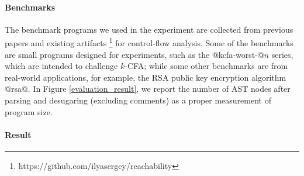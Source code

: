 \paragraph{Benchmarks}
The benchmark programs we used in the experiment are collected from
previous papers \cite{Johnson:2013:OAA:2500365.2500604, ashley:practical,
DBLP:journals/corr/abs-1102-3676} and existing artifacts
\footnote{https://github.com/ilyasergey/reachability} for control-flow
analysis.  Some of the benchmarks are small programs designed for
experiments, such as the @kcfa-worst-@$n$ series, which are intended
to challenge $k$-CFA; while some other benchmarks are from real-world
applications, for example, the RSA public key encryption algorithm
@rsa@. In Figure \ref{evaluation_result}, we report the number of
AST nodes after parsing and desugaring (excluding comments) as a proper
measurement of program size.

\paragraph{Result}

